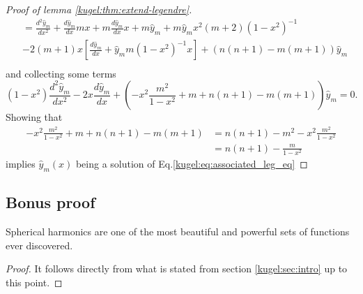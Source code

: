 \begin{proof}[Proof of lemma \ref{kugel:thm:extend-legendre}]
\begin{align*}
    &= \frac{d^2\hat{y}_m}{dx^2} + \frac{d\hat{y}_m}{dx}mx + m\frac{d\hat{y}_m}{dx}x + m\hat{y}_m + m\hat{y}_m x^2(m+2)(1-x^2)^{-1} \\
    &-2(m+1)x\left[  \frac{d\hat{y}_m}{dx} + \hat{y}_mm(1-x^2)^{-1}x \right] + (n(n+1)-m(m+1))\hat{y}_m\\
  \end{align*}
  and collecting some terms
  \begin{equation*}
    (1-x^2)\frac{d^2\hat{y}_m}{dx^2} - 2x\frac{d\hat{y}_m}{dx} + \left( -x^2 \frac{m^2}{1-x^2} + m+n(n+1)-m(m+1)\right)\hat{y}_m=0.
  \end{equation*}
  Showing that 
  \begin{align*}
    -x^2 \frac{m^2}{1-x^2} + m+n(n+1)-m(m+1) &= n(n+1)- m^2 -x^2 \frac{m^2}{1-x^2} \\
    &= n(n+1)- \frac{m}{1-x^2}
  \end{align*}
  implies $\hat{y}_m(x)$ being a solution of Eq.\eqref{kugel:eq:associated_leg_eq}
\end{proof}

\subsection*{Bonus proof}
\begin{theorem}
  Spherical harmonics are one of the most beautiful and powerful sets of
  functions ever discovered.
\end{theorem}
\begin{proof}
  It follows directly from what is stated from section \ref{kugel:sec:intro} up to this point.
\end{proof}
